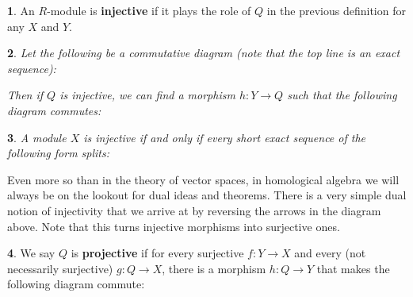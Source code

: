 \documentclass[oneside,english]{amsbook}
\numberwithin{section}{chapter}
\theoremstyle{plain}
\newtheorem{thm}{\protect\theoremname}
\theoremstyle{definition}
\newtheorem{defn}[thm]{\protect\definitionname}
\providecommand{\definitionname}{Definition}
\providecommand{\theoremname}{Theorem}
\begin{document}
			\begin{defn}
				An $R$-module is \textbf{injective} if it plays the role of $Q$ in the previous definition for any $X$ and $Y$.
			\end{defn}

			\begin{thm}
				Let the following be a commutative diagram (note that the top line is an exact sequence):
				\begin{center}
				\end{center}
				Then if $Q$ is injective, we can find a morphism $h:Y\to Q$ such that the following diagram commutes:
				\begin{center}
				\end{center}
			\end{thm}
			
			\begin{thm}
				A module $X$ is injective if and only if every short exact sequence of the following form splits:
				
				\begin{center}
				\end{center}


			\end{thm}
			
			Even more so than in the theory of vector spaces, in homological algebra we will always be on the lookout for dual ideas and theorems. There is a very simple dual notion of injectivity that we arrive at by reversing the arrows in the diagram above. Note that this turns injective morphisms into surjective ones.
			
			\begin{defn}
				We say $Q$ is \textbf{projective} if for every surjective $f:Y\to X$ and every (not necessarily surjective) $g:Q\to X$, there is a morphism $h:Q\to Y$ that makes the following diagram commute:

				\begin{center}
				\end{center}

			\end{defn}
			
\end{document}
